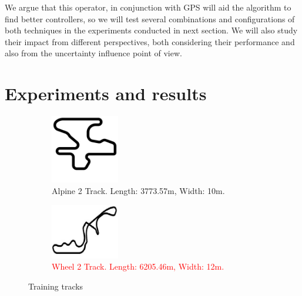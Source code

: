 \documentclass[10pt,journal,compsoc]{IEEEtran}
\begin{document}
We argue that this operator, in conjunction with GPS will aid the
algorithm to find better controllers, so we will test several
combinations and configurations of both techniques in the experiments
conducted in next section. We will also study their impact from
different perspectives, both considering their performance and also
from the uncertainty influence point of view. 



\section{Experiments and results}  
\label{sec:results}

%
\begin{figure}[!ht]	
\centering
\begin{subfigure}[b]{0.15\textwidth}
	\centering
	\includegraphics[width=3cm]{fig/alpine2.jpg}
	\caption{Alpine 2 Track.  Length: 3773.57m, Width: 10m.}
	\label{fig:alpine2}
\end{subfigure}
\hfill
\begin{subfigure}[b]{0.15\textwidth}
	\centering
	\includegraphics[width=3cm]{fig/wheel2.jpg}
	\caption{\textcolor{red}{Wheel 2 Track.  Length: 6205.46m, Width: 12m.}}
	\label{fig:wheel2}
\end{subfigure}
\caption{Training tracks}
\label{alpine2_wheel2track}
\end{figure}
\end{document}

